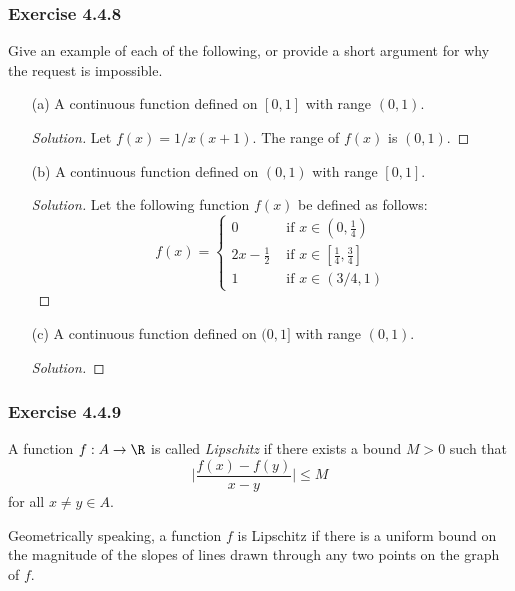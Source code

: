 \subsubsection{Exercise 4.4.8} Give an example of each of the following, or provide a short argument for why the request is impossible.
\begin{enumerate}
    \item[(a)] A continuous function defined on \( [0,1] \) with range \( (0,1) \).
        \begin{proof}[Solution]
        Let \( f(x) = 1 / x(x+1) \). The range of \( f(x) \) is \( (0,1) \).   
        \end{proof}
    \item[(b)] A continuous function defined on \( (0,1) \) with range \( [0,1] \).
        \begin{proof}[Solution]
        Let the following function \( f(x) \) be defined as follows:
        \[ f(x) = 
        \begin{cases}
            0 &\text{ if } x \in (0, \frac{ 1 }{ 4 } ) \\
            2x - \frac{ 1 }{ 2 } &\text{ if } x \in [ \frac{ 1 }{ 4 }, \frac{ 3 }{ 4 } ] \\
            1 &\text{ if } x \in (3/4, 1)
        \end{cases} \]
        \end{proof}
    \item[(c)] A continuous function defined on \( (0,1] \) with range \( (0,1) \).
        \begin{proof}[Solution]
        
        \end{proof}
\end{enumerate}


\subsubsection{Exercise 4.4.9}
\begin{tcolorbox}
    \begin{defn}
        A function \( f: A \to \R  \) is called \textit{Lipschitz} if there exists a bound \( M > 0  \) such that 
        \[ \Big| \frac{ f(x) - f(y) }{ x - y  }   \Big| \leq M  \]
        for all \( x \neq y \in A  \).
    \end{defn}
\end{tcolorbox}
Geometrically speaking, a function \( f \) is Lipschitz if there is a uniform bound on the magnitude of the slopes of lines drawn through any two points on the graph of \( f \).

